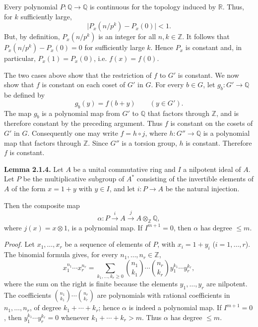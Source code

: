 Every polynomial $P:\mathbb Q\to\mathbb Q$ is continuous for the topology
induced by $\mathbb R$. Thus, for $k$ sufficiently large,
\[
\lvert P_x(n/p^k)-P_x(0)\rvert<1.
\]
But, by definition, $P_x(n/p^k)$ is an integer for all
$n,k\in\mathbb Z$. It follows that $P_x(n/p^k)-P_x(0)=0$ for sufficiently
large $k$. Hence $P_x$ is constant and, in particular,
$P_x(1)=P_x(0)$, i.e. $f(x)=f(0)$.

The two cases above show that the restriction of $f$ to $G'$ is constant.
We now show that $f$ is constant on each coset of $G'$ in $G$. For every
$b\in G$, let $g_b:G'\to\mathbb Q$ be defined by
\[
g_b(y)=f(b+y)\qquad(y\in G').
\]
The map $g_b$ is a polynomial map from $G'$ to $\mathbb Q$ that factors
through $\mathbb Z$, and is therefore constant by the preceding argument.
Thus $f$ is constant on the cosets of $G'$ in $G$. Consequently one may
write $f=h\circ j$, where $h:G''\to\mathbb Q$ is a polynomial map that
factors through $\mathbb Z$. Since $G''$ is a torsion group, $h$ is constant.
Therefore $f$ is constant.

\textbf{Lemma 2.1.4.}
Let $A$ be a unital commutative ring and $I$ a nilpotent ideal of $A$. Let
$P$ be the multiplicative subgroup of $A^*$ consisting of the invertible elements
of $A$ of the form $x=1+y$ with $y\in I$, and let $i:P\to A$ be the natural
injection.

Then the composite map
\[
\alpha:P\xrightarrow{i}A\xrightarrow{j}A\otimes_{\mathbb Z}\mathbb Q,
\]
where $j(x)=x\otimes1$, is a polynomial map. If $I^{m+1}=0$, then $\alpha$
has degree $\leq m$.

\emph{Proof.}
Let $x_1,\ldots,x_r$ be a sequence of elements of $P$, with
$x_i=1+y_i$ ($i=1,\ldots,r$). The binomial formula gives, for every
$n_1,\ldots,n_r\in\mathbb Z$,
\begin{equation}\tag{2.1.5}
x_1^{n_1}\cdots x_r^{n_r}=
\sum_{k_1,\ldots,k_r\geq0}
\binom{n_1}{k_1}\cdots\binom{n_r}{k_r}
y_1^{k_1}\cdots y_r^{k_r},
\end{equation}
where the sum on the right is finite because the elements
$y_1,\ldots,y_r$ are nilpotent. The coefficients
$\binom{n_1}{k_1}\cdots\binom{n_r}{k_r}$ are polynomials with rational
coefficients in $n_1,\ldots,n_r$, of degree $k_1+\cdots+k_r$; hence
$\alpha$ is indeed a polynomial map. If $I^{m+1}=0$, then
$y_1^{k_1}\cdots y_r^{k_r}=0$ whenever $k_1+\cdots+k_r>m$. Thus $\alpha$
has degree $\leq m$.

